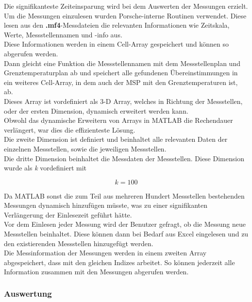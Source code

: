 Die signifikanteste Zeiteinsparung wird bei dem Auswerten der Messungen erzielt. \\
Um die Messungen einzulesen wurden Porsche-interne Routinen verwendet. Diese lesen aus den \textbf{.mf4}-Messdateien die relevanten Informationen wie Zeitskala, Werte, Messstellennamen und -info aus. \\
Diese Informationen werden in einem Cell-Array gespeichert und können so abgerufen werden. \\
Dann gleicht eine Funktion die Messstellennamen mit dem Messstellenplan und Grenztemperaturplan ab und speichert alle gefundenen Übereinstimmungen in ein weiteres Cell-Array, in dem auch der MSP mit den Grenztemperaturen ist, ab. \\
Dieses Array ist vordefiniert als 3-D Array, welches in Richtung der Messstellen, oder der ersten Dimension, dynamisch erweitert werden kann. \\
Obwohl das dynamische Erweitern von Arrays in MATLAB die Rechendauer verlängert, war dies die effizienteste Lösung.\\
Die zweite Dimension ist definiert und beinhaltet alle relevanten Daten der einzelnen Messstellen, sowie die jeweiligen Messstellen. \\

\newpage
Die dritte Dimension beinhaltet die Messdaten der Messstellen. Diese Dimension wurde als \textit{k} vordefiniert mit 

\begin{equation}
	k = 100
\end{equation}

Da MATLAB sonst die zum Teil aus mehreren Hundert Messstellen bestehenden Messungen dynamisch hinzufügen müsste, was zu einer signifikanten Verlängerung der Einlesezeit geführt hätte.\\
Vor dem Einlesen jeder Messung wird der Benutzer gefragt, ob die Messung neue Messstellen beinhaltet. Diese können dann bei Bedarf aus Excel eingelesen und zu den existierenden Messstellen hinzugefügt werden. \\
Die Messinformation der Messungen werden in einem zweiten Array abgespeichert, dass mit den gleichen Indizes arbeitet. So können jederzeit alle Information zusammen mit den Messungen abgerufen werden. \\

\subsubsection{Auswertung}


